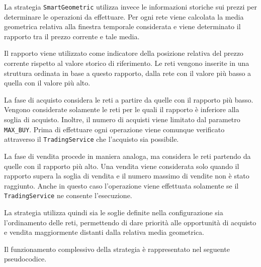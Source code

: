 \documentclass[a4paper,oneside,italian]{sapthesis}
\begin{document}
La strategia \texttt{SmartGeometric} utilizza invece le informazioni
storiche sui prezzi per determinare le operazioni da effettuare. Per ogni
rete viene calcolata la media geometrica relativa alla finestra temporale
considerata e viene determinato il rapporto tra il prezzo corrente e tale
media.

Il rapporto viene utilizzato come indicatore della posizione relativa del
prezzo corrente rispetto al valore storico di riferimento. Le reti vengono
inserite in una struttura ordinata in base a questo rapporto, dalla rete
con il valore più basso a quella con il valore più alto.

La fase di acquisto considera le reti a partire da quelle con il rapporto
più basso. Vengono considerate solamente le reti per le quali il rapporto
è inferiore alla soglia di acquisto. Inoltre, il numero di acquisti viene
limitato dal parametro \texttt{MAX\_BUY}. Prima di effettuare ogni
operazione viene comunque verificato attraverso il \texttt{TradingService}
che l'acquisto sia possibile.

La fase di vendita procede in maniera analoga, ma considera le reti
partendo da quelle con il rapporto più alto. Una vendita viene considerata
solo quando il rapporto supera la soglia di vendita e il numero massimo di
vendite non è stato raggiunto. Anche in questo caso l'operazione viene
effettuata solamente se il \texttt{TradingService} ne consente l'esecuzione.

La strategia utilizza quindi sia le soglie definite nella configurazione
sia l'ordinamento delle reti, permettendo di dare priorità alle opportunità
di acquisto e vendita maggiormente distanti dalla relativa media
geometrica.

Il funzionamento complessivo della strategia è rappresentato nel seguente
pseudocodice.
\end{document}
